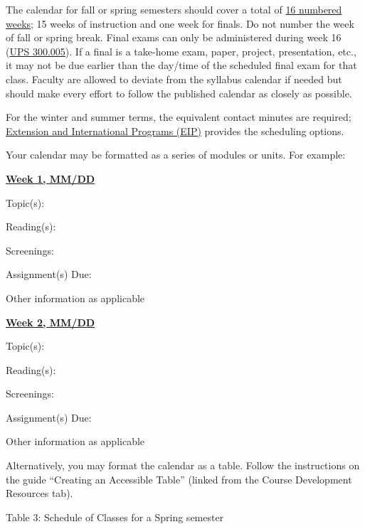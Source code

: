 \documentclass[12pt]{article}
\begin{document}
{\color{annotationblue}The calendar for fall or spring semesters should cover a total of \uline{16 numbered weeks}; 15 weeks of instruction and one week for finals. Do not number the week of fall or spring break. Final exams can only be administered during week 16 (\href{https://www.fullerton.edu/senate/publications_policies_resolutions/ups/UPS\%20300/UPS\%20300.005.pdf}{UPS 300.005}). If a final is a take-home exam, paper, project, presentation, etc., it may not be due earlier than the day/time of the scheduled final exam for that class. Faculty are allowed to deviate from the syllabus calendar if needed but should make every effort to follow the published calendar as closely as possible.}

{\color{annotationblue}For the winter and summer terms, the equivalent contact minutes are required; \href{https://extension.fullerton.edu/}{Extension and International Programs (EIP)} provides the scheduling options.}

{\color{annotationblue}Your calendar may be formatted as a series of modules or units. For example:}

\textbf{\uline{Week 1, MM/DD}}

Topic(s):

Reading(s):

Screenings:

Assignment(s) Due:

Other information as applicable

\textbf{\uline{Week 2, MM/DD}}

Topic(s):

Reading(s):

Screenings:

Assignment(s) Due:

Other information as applicable

{\color{annotationblue}Alternatively, you may format the calendar as a table. Follow the instructions on the guide ``Creating an Accessible Table'' (linked from the Course Development Resources tab).}

\begin{center}
Table 3: Schedule of Classes for a Spring semester
\end{center}

\end{document}
